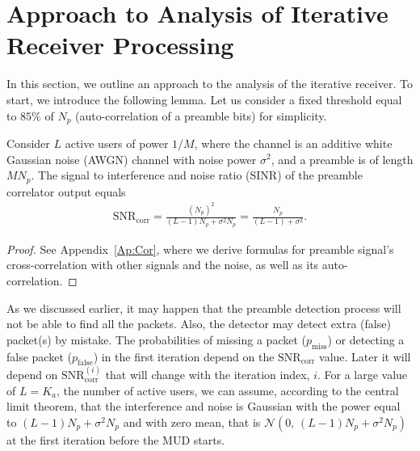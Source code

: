 \documentclass[journal,onecolumn,12pt]{IEEEtran}
\begin{document}
\section{Approach to Analysis of Iterative Receiver Processing}\label{MoreGranAnalysis}
In this section, we outline an approach to the analysis of the iterative receiver. To start, we introduce the following lemma. Let us consider a fixed threshold equal to $85\%$ of $N_p$ (auto-correlation of a preamble bits) for simplicity.

\begin{lemma} Consider $L$ active users of power $1/M$, where the channel is an additive white Gaussian noise (AWGN) channel with noise power $\sigma^2$, and a preamble is of length $MN_p$. The signal to interference and noise ratio (SINR) of the preamble correlator output equals
	\begin{align}
	\text{SNR}_{\text{corr}} = \frac{(N_p)^2}{(L-1)N_p+\sigma^2N_p}=\frac{N_p}{(L-1)+\sigma^2}.\label{eq:SNRCor}
	\end{align}
\end{lemma}
\begin{proof}
	See Appendix~\ref{Ap:Cor}, where we derive formulas for preamble signal's cross-correlation with other signals and the noise, as well as its auto-correlation.
\end{proof}  

As we discussed earlier, it may happen that the preamble detection process will not be able to find all the packets. Also, the detector may detect extra (false) packet(s) by mistake. The probabilities of missing a packet ($p_\text{miss}$) or detecting a false packet ($p_\text{false}$) in the first iteration depend on the $\text{SNR}_{\text{corr}}$ value. Later it will depend on $\text{SNR}_{\text{corr}}^{(i)}$ that will change with the iteration index, $i$. For a large value of $L=K_a$, the number of active users, we can assume, according to the central limit theorem, that the interference and noise is Gaussian with the power equal to $(L-1)N_p+\sigma^2N_p$ and with zero mean, that is $ \mathcal{N}(0,\,(L-1)N_p+\sigma^{2}N_p)$ at the first iteration before the MUD starts. 
\end{document}
